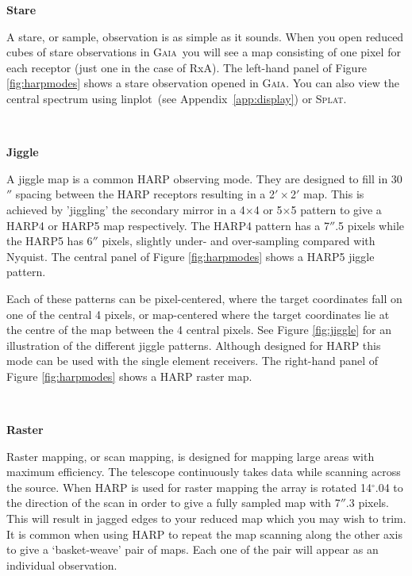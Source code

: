 \documentclass[twoside,11pt]{article}
\newcommand{\htmlref}[2]{#1}
\newcommand{\latexhtml}[2]{#1}
\newcommand{\xref}[3]{#1}
\renewcommand{\_}{\texttt{\symbol{95}}}
\newcommand{\gaia}{\xref{\textsc{Gaia}}{sun214}{}}
\newcommand{\splat}{\xref{\textsc{Splat}}{sun243}{}}
\newcommand{\task}[1]{\textsf{#1}}
\newcommand{\linplot}{\xref{\task{linplot}}{sun95}{LINPLOT}}
\newcommand{\cref}[3]{\latexhtml{#1~\ref{#2}}{\htmlref{#3}{#2}}}
\begin{document}
\begin{minipage}[t]{0.14\linewidth}
\textbf{Stare}
\end{minipage}
\begin{minipage}[t]{0.85\linewidth}
A stare, or sample, observation is as simple as it sounds. When you open reduced cubes of stare observations in \gaia\ you will see a map consisting of one pixel for each receptor (just one in the case of RxA). The left-hand panel of Figure \ref{fig:harpmodes} shows a stare observation opened in \gaia. You can also view the central spectrum using \linplot\ (see \cref{Appendix}{app:display}{Viewing your data with KAPPA}) or \splat. 
\end{minipage}
\vspace{0.7cm}\\
\begin{minipage}[t]{0.14\linewidth}
\textbf{Jiggle}
\end{minipage}
\begin{minipage}[t]{0.85\linewidth}
A jiggle map is a common HARP observing mode. They are designed to fill in 30$''$ spacing between the HARP receptors resulting in a 2$'\times$2$'$ map. This is achieved by 'jiggling' the secondary mirror in a 4$\times$4 or 5$\times$5 pattern to give a HARP4 or HARP5 map respectively.   The HARP4 pattern has a 7$''$.5 pixels while the HARP5 has 6$''$ pixels, slightly under- and over-sampling compared with Nyquist. The central panel of Figure \ref{fig:harpmodes} shows a HARP5 jiggle pattern.  

Each of these patterns can be pixel-centered, where the target coordinates fall on one of the central 4 pixels, or map-centered where the target coordinates lie at the centre of the map between the 4 central pixels. See Figure \ref{fig:jiggle} for an illustration of the different jiggle patterns. Although designed for HARP this mode can be used with the single element receivers. The right-hand panel of Figure \ref{fig:harpmodes} shows a HARP raster map.
\end{minipage}
\vspace{0.7cm}\\
\begin{minipage}[t]{0.14\linewidth}
\textbf{Raster}
\end{minipage}
\begin{minipage}[t]{0.85\linewidth}
Raster mapping, or scan mapping, is designed for mapping large areas with maximum efficiency. The telescope continuously takes data while scanning across the source. When HARP is used for raster mapping the array is rotated 14$^\circ$.04 to the direction of the scan in order to give a fully sampled map with 7$''$.3 pixels. This will result in jagged edges to your reduced map which you may wish to trim. It is common when using HARP to repeat the map scanning along the other axis to give a `basket-weave'  pair of maps. Each one of the pair will appear as an individual observation.
\end{minipage}
\end{document}
